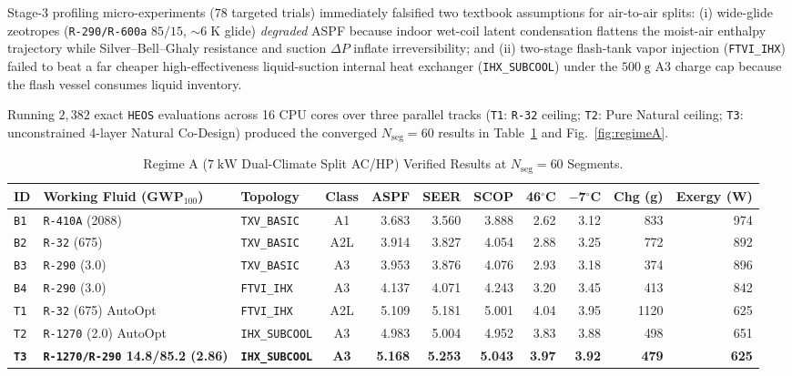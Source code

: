 \documentclass[twocolumn,10pt]{article}
\begin{document}
Stage-3 profiling micro-experiments ($78$ targeted trials) immediately falsified two textbook assumptions for air-to-air splits: (i) wide-glide zeotropes (\texttt{R-290/R-600a} $85/15$, $\sim 6\;\text{K}$ glide) \emph{degraded} ASPF because indoor wet-coil latent condensation flattens the moist-air enthalpy trajectory while Silver--Bell--Ghaly resistance and suction $\Delta P$ inflate irreversibility; and (ii) two-stage flash-tank vapor injection (\texttt{FTVI\_IHX}) failed to beat a far cheaper high-effectiveness liquid-suction internal heat exchanger (\texttt{IHX\_SUBCOOL}) under the $500\;\text{g}$ A3 charge cap because the flash vessel consumes liquid inventory.

Running $2{,}382$ exact \texttt{HEOS} evaluations across 16 CPU cores over three parallel tracks (\texttt{T1}: \texttt{R-32} ceiling; \texttt{T2}: Pure Natural ceiling; \texttt{T3}: unconstrained 4-layer Natural Co-Design) produced the converged $N_{\text{seg}}=60$ results in Table~\ref{tab:regimeA} and Fig.~\ref{fig:regimeA}.

\begin{table}[t]
\centering
\caption{Regime A ($7\;\text{kW}$ Dual-Climate Split AC/HP) Verified Results at $N_{\text{seg}}=60$ Segments.}
\label{tab:regimeA}
\small
\begin{tabular}{@{}lllcrrrrrrr@{}}
\toprule
\textbf{ID} & \textbf{Working Fluid (GWP$_{100}$)} & \textbf{Topology} & \textbf{Class} & \textbf{ASPF} & \textbf{SEER} & \textbf{SCOP} & \textbf{46$^\circ$C} & \textbf{$-$7$^\circ$C} & \textbf{Chg (g)} & \textbf{Exergy (W)} \\
\midrule
\texttt{B1} & \texttt{R-410A} (2088) & \texttt{TXV\_BASIC} & A1 & 3.683 & 3.560 & 3.888 & 2.62 & 3.12 & 833 & 974 \\
\texttt{B2} & \texttt{R-32} (675) & \texttt{TXV\_BASIC} & A2L & 3.914 & 3.827 & 4.054 & 2.88 & 3.25 & 772 & 892 \\
\texttt{B3} & \texttt{R-290} (3.0) & \texttt{TXV\_BASIC} & A3 & 3.953 & 3.876 & 4.076 & 2.93 & 3.18 & 374 & 896 \\
\texttt{B4} & \texttt{R-290} (3.0) & \texttt{FTVI\_IHX} & A3 & 4.137 & 4.071 & 4.243 & 3.20 & 3.45 & 413 & 842 \\
\midrule
\texttt{T1} & \texttt{R-32} (675) AutoOpt & \texttt{FTVI\_IHX} & A2L & 5.109 & 5.181 & 5.001 & 4.04 & 3.95 & 1120 & 625 \\
\texttt{T2} & \texttt{R-1270} (2.0) AutoOpt & \texttt{IHX\_SUBCOOL} & A3 & 4.983 & 5.004 & 4.952 & 3.83 & 3.88 & 498 & 651 \\
\textbf{\texttt{T3}} & \textbf{\texttt{R-1270/R-290} 14.8/85.2 (2.86)} & \textbf{\texttt{IHX\_SUBCOOL}} & \textbf{A3} & \textbf{5.168} & \textbf{5.253} & \textbf{5.043} & \textbf{3.97} & \textbf{3.92} & \textbf{479} & \textbf{625} \\
\bottomrule
\end{tabular}
\end{table}
\end{document}
